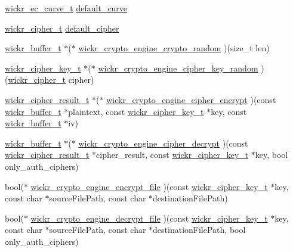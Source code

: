 \begin{DoxyCompactItemize}
\item 
\hyperlink{structwickr__ec__curve}{wickr\+\_\+ec\+\_\+curve\+\_\+t} \hyperlink{structwickr__crypto__engine_a2145e35235dc5c5c944f33ea3d2963bd}{default\+\_\+curve}
\item 
\hyperlink{structwickr__cipher}{wickr\+\_\+cipher\+\_\+t} \hyperlink{structwickr__crypto__engine_a307f7d46b55b1e0a93ce9d9489ba8fc5}{default\+\_\+cipher}
\item 
\hyperlink{structwickr__buffer}{wickr\+\_\+buffer\+\_\+t} $\ast$($\ast$ \hyperlink{group__wickr__crypto__engine_gae12855853c05caa473e748a62611d307}{wickr\+\_\+crypto\+\_\+engine\+\_\+crypto\+\_\+random} )(size\+\_\+t len)
\item 
\hyperlink{structwickr__cipher__key}{wickr\+\_\+cipher\+\_\+key\+\_\+t} $\ast$($\ast$ \hyperlink{group__wickr__crypto__engine_gabc120effc5248a491b18138f9b74b526}{wickr\+\_\+crypto\+\_\+engine\+\_\+cipher\+\_\+key\+\_\+random} )(\hyperlink{structwickr__cipher}{wickr\+\_\+cipher\+\_\+t} cipher)
\item 
\hyperlink{structwickr__cipher__result}{wickr\+\_\+cipher\+\_\+result\+\_\+t} $\ast$($\ast$ \hyperlink{group__wickr__crypto__engine_ga5aacf927a96a30aa63f3fc1bce262caf}{wickr\+\_\+crypto\+\_\+engine\+\_\+cipher\+\_\+encrypt} )(const \hyperlink{structwickr__buffer}{wickr\+\_\+buffer\+\_\+t} $\ast$plaintext, const \hyperlink{structwickr__cipher__key}{wickr\+\_\+cipher\+\_\+key\+\_\+t} $\ast$key, const \hyperlink{structwickr__buffer}{wickr\+\_\+buffer\+\_\+t} $\ast$iv)
\item 
\hyperlink{structwickr__buffer}{wickr\+\_\+buffer\+\_\+t} $\ast$($\ast$ \hyperlink{group__wickr__crypto__engine_ga81cff182bb87f963996b75891e242ed4}{wickr\+\_\+crypto\+\_\+engine\+\_\+cipher\+\_\+decrypt} )(const \hyperlink{structwickr__cipher__result}{wickr\+\_\+cipher\+\_\+result\+\_\+t} $\ast$cipher\+\_\+result, const \hyperlink{structwickr__cipher__key}{wickr\+\_\+cipher\+\_\+key\+\_\+t} $\ast$key, bool only\+\_\+auth\+\_\+ciphers)
\item 
bool($\ast$ \hyperlink{group__wickr__crypto__engine_gaa77b1bc373d92d9db9d801bcc4a4d29c}{wickr\+\_\+crypto\+\_\+engine\+\_\+encrypt\+\_\+file} )(const \hyperlink{structwickr__cipher__key}{wickr\+\_\+cipher\+\_\+key\+\_\+t} $\ast$key, const char $\ast$source\+File\+Path, const char $\ast$destination\+File\+Path)
\item 
bool($\ast$ \hyperlink{group__wickr__crypto__engine_ga361b843efc839e30f90ce24c15b1dd27}{wickr\+\_\+crypto\+\_\+engine\+\_\+decrypt\+\_\+file} )(const \hyperlink{structwickr__cipher__key}{wickr\+\_\+cipher\+\_\+key\+\_\+t} $\ast$key, const char $\ast$source\+File\+Path, const char $\ast$destination\+File\+Path, bool only\+\_\+auth\+\_\+ciphers)

\end{DoxyCompactItemize}
